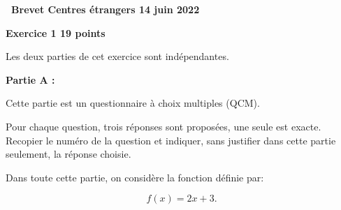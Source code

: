 \documentclass[11pt]{article}
\begin{document}
\label{Etranger}

\pagestyle{fancy}
\thispagestyle{empty}
\begin{center} {\huge \textbf{\decofourleft~Brevet Centres étrangers 14 juin 2022 \decofourright}}
\end{center}

\bigskip

\textbf{Exercice 1 \hfill 19 points}

\medskip

Les deux parties de cet exercice sont indépendantes. 

\medskip

\textbf{Partie A :}

\medskip

Cette partie est un questionnaire à choix multiples (QCM).

Pour chaque question, trois réponses sont proposées, une seule est exacte. Recopier le numéro de la question et indiquer, sans justifier dans cette partie seulement, la réponse choisie.

Dans toute cette partie, on considère la fonction définie par: 

\[f(x) = 2x + 3.\]
\end{document}
